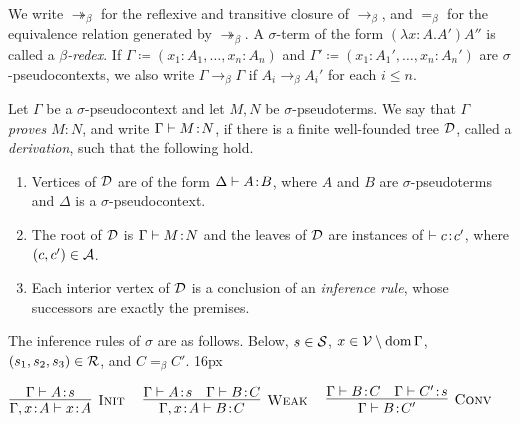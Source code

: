 \documentclass[reqno, twoside]{article}
\begin{document}
    \begin{notation}
        We write $\twoheadrightarrow_\beta$ for the reflexive and transitive closure of $\rightarrow_\beta$, and $=_\beta$ for the equivalence relation generated by $\twoheadrightarrow_\beta$. A $\sigma$-term of the form $(\lambda x\!:\!A.A')A''$ is called a \textit{$\beta$-redex}. If $\Gamma\coloneqq(x_1\!:\!A_1,\dots,x_n\!:\!A_n)$ and $\Gamma'\coloneqq(x_1\!:\!A_1',\dots,x_n\!:\!A_n')$ are $\sigma$-pseudocontexts, we also write $\Gamma\rightarrow_\beta\Gamma$ if $A_i\rightarrow_\beta A_i'$ for each $i\leq n$.
    \end{notation}

    \begin{definition}\label{rules}
        Let $\Gamma$ be a $\sigma$-pseudocontext and let $M,N$ be $\sigma$-pseudoterms. We say that \textit{$\Gamma$ proves $M\!:\!N$}, and write $\Gamma\vdash M\!:\!N$, if there is a finite well-founded tree $\mathcal{D}$, called a \textit{derivation}, such that the following hold.
        \begin{enumerate}
            \item Vertices of $\mathcal{D}$ are of the form $\Delta\vdash A\!:\!B$, where $A$ and $B$ are $\sigma$-pseudoterms and $\Delta$ is a $\sigma$-pseudocontext.
                \vspace{-0.20in}
            \item The root of $\mathcal{D}$ is $\Gamma\vdash M\!:\!N$ and the leaves of $\mathcal{D}$ are instances of $\vdash c\!:\!c'$, where $(c,c')\in\mathcal{A}$.
                \vspace{-0.05in}
            \item Each interior vertex of $\mathcal{D}$ is a conclusion of an \textit{inference rule}, whose successors are exactly the premises.
        \end{enumerate}
        The inference rules of $\sigma$ are as follows. Below, $s\in\mathcal{S}$, $x\in\mathcal{V}\setminus\operatorname{dom}\Gamma$, $(s_1,s_2,s_3)\in\mathcal{R}$, and $C=_\beta C'$.
        \hfuzz16px\begin{adjustwidth}{-8pt}{0pt}\vspace{-0.1in}
        {\small\begin{equation*}
            \begin{gathered}
                \infer[\mathsc{Init}]{\Gamma,x\!:\!A\proves x\!:\!A}{\Gamma\proves A\!:\!s}\ \ \ \ 
                \infer[\mathsc{Weak}]{\Gamma,x\!:\!A\proves B\!:\!C}{\Gamma\proves A\!:\!s & \Gamma\proves B\!:\!C}\ \ \ \ 
                \infer[\mathsc{Conv}]{\Gamma\proves B\!:\!C'}{\Gamma\proves B\!:\!C & \Gamma\proves C'\!:\!s}\ \ \ \ 

\end{gathered}
\end{equation*}}
\end{adjustwidth}
\end{definition}
\end{document}
